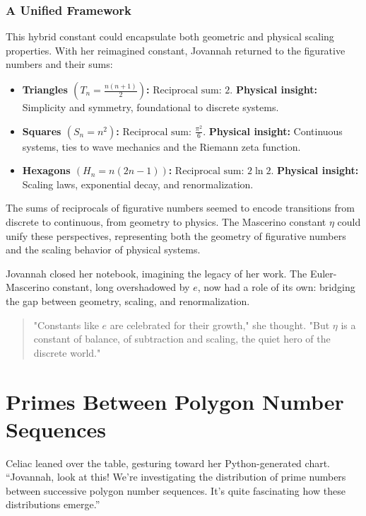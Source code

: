 \subsubsection*{A Unified Framework}
 This hybrid constant could encapsulate both geometric and physical scaling properties. With her reimagined constant, Jovannah returned to the figurative numbers and their sums:

\begin{itemize}
    \item \textbf{Triangles \((T_n = \frac{n(n+1)}{2})\):}
    \(
    \text{Reciprocal sum: } 2.
    \)
    \textbf{Physical insight:} Simplicity and symmetry, foundational to discrete systems.

    \item \textbf{Squares \((S_n = n^2)\):}
    \(
    \text{Reciprocal sum: } \frac{\pi^2}{6}.
    \)
    \textbf{Physical insight:} Continuous systems, ties to wave mechanics and the Riemann zeta function.

    \item \textbf{Hexagons \((H_n = n(2n-1))\):}
    \(
    \text{Reciprocal sum: } 2\ln 2.
    \)
    \textbf{Physical insight:} Scaling laws, exponential decay, and renormalization.
\end{itemize}

The sums of reciprocals of figurative numbers seemed to encode transitions from discrete to continuous, from geometry to physics. The Mascerino constant \(\eta\) could unify these perspectives, representing both the geometry of figurative numbers and the scaling behavior of physical systems.

Jovannah closed her notebook, imagining the legacy of her work. The Euler-Mascerino constant, long overshadowed by \(e\), now had a role of its own: bridging the gap between geometry, scaling, and renormalization. 

\begin{quote}
"Constants like \(e\) are celebrated for their growth," she thought. "But \(\eta\) is a constant of balance, of subtraction and scaling, the quiet hero of the discrete world."
\end{quote}
\newpage



\section*{Primes Between Polygon Number Sequences}

Celiac leaned over the table, gesturing toward her Python-generated chart. “Jovannah, look at this! We’re investigating the distribution of prime numbers between successive polygon number sequences. It’s quite fascinating how these distributions emerge.”

